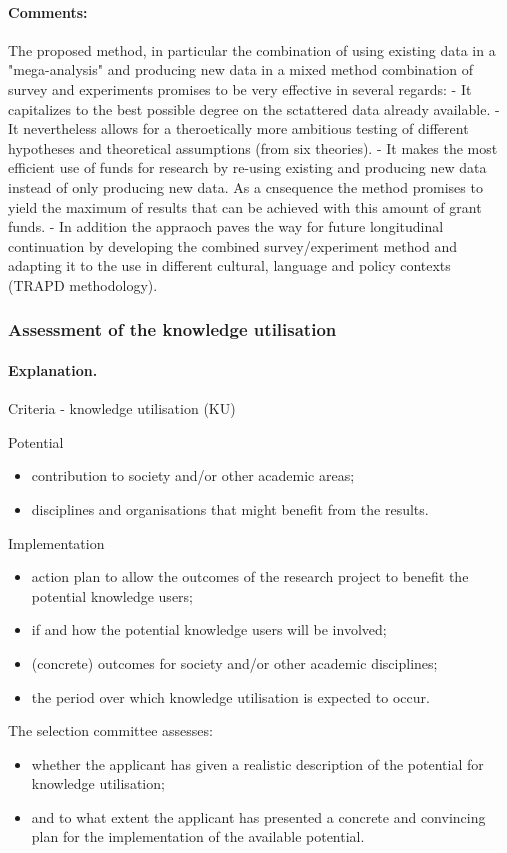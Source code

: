 \documentclass[twocolumn, serif, rga, numeric]{jote-article}
\begin{document}
\paragraph{Comments:}
The proposed method, in particular the combination of using existing data in a "mega-analysis" and producing new data in a mixed method combination of survey and experiments promises to be very effective in several regards:
- It capitalizes to the best possible degree on the sctattered data already available.
- It nevertheless allows for a theroetically more ambitious testing of different hypotheses and theoretical assumptions (from six theories).
- It makes the most efficient use of funds for research by re-using existing and producing new data instead of only producing new data. As a cnsequence the method promises to yield the maximum of results that can be achieved with this amount of grant funds.
- In addition the appraoch paves the way for future longitudinal continuation by developing the combined survey/experiment method and adapting it to the use in different cultural, language and policy contexts (TRAPD methodology).
 {}\subsubsection*{Assessment of the knowledge utilisation} 
\paragraph{Explanation.}
Criteria - knowledge utilisation (KU)

\noindent Potential 
\begin{itemize}
\item contribution to society and/or other academic areas; \item disciplines and organisations that might benefit from the results. 
\end{itemize}
Implementation \begin{itemize}

\item action plan to allow the outcomes of the research project to benefit the potential knowledge users; \item if and how the potential knowledge users will be involved; \item (concrete) outcomes for society and/or other academic disciplines;\item the period over which knowledge utilisation is expected to occur. 
\end{itemize}
The selection committee assesses: 
\begin{itemize}


\item whether the applicant has given a realistic description of the potential for knowledge utilisation; \item and to what extent the applicant has presented a concrete and convincing plan for the implementation of the available potential. 
\end{itemize}
\end{document}
